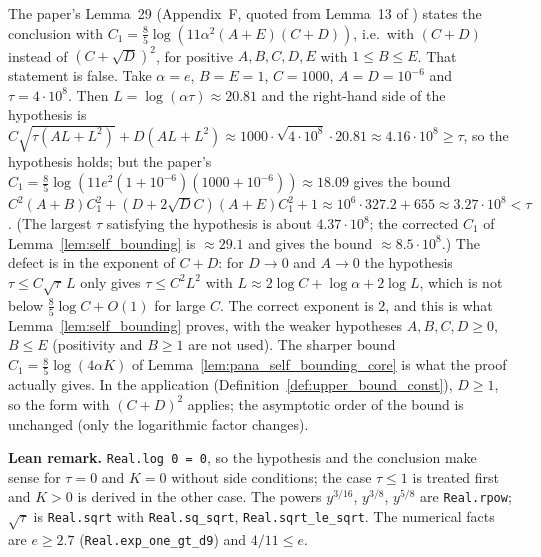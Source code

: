 \begin{remark}\label{rem:pana_self_bounding_paper}
The paper's Lemma~29 (Appendix~F, quoted from Lemma~13 of \cite{menard2021fast}) states the
conclusion with $C_1 = \frac85\log(11\alpha^2(A+E)(C+D))$, i.e.\ with $(C + D)$ instead of
$(C + \sqrt D)^2$, for positive $A, B, C, D, E$ with $1 \le B \le E$. That statement is false.
Take $\alpha = e$, $B = E = 1$, $C = 1000$, $A = D = 10^{-6}$ and $\tau = 4\cdot 10^8$. Then
$L = \log(\alpha\tau) \approx 20.81$ and the right-hand side of the hypothesis is
$C\sqrt{\tau(AL + L^2)} + D(AL + L^2) \approx 1000\cdot\sqrt{4\cdot10^8}\cdot 20.81
\approx 4.16\cdot 10^8 \ge \tau$, so the hypothesis holds; but the paper's
$C_1 = \frac85\log(11e^2(1 + 10^{-6})(1000 + 10^{-6})) \approx 18.09$ gives the bound
$C^2(A+B)C_1^2 + (D + 2\sqrt D C)(A+E)C_1^2 + 1 \approx 10^6\cdot 327.2 + 655 \approx 3.27\cdot 10^8 < \tau$.
(The largest $\tau$ satisfying the hypothesis is about $4.37\cdot 10^8$; the corrected $C_1$
of Lemma~\ref{lem:self_bounding} is $\approx 29.1$ and gives the bound $\approx 8.5\cdot10^8$.)
The defect is in the exponent of $C + D$: for $D \to 0$ and $A \to 0$ the hypothesis
$\tau \le C\sqrt\tau\,L$ only gives $\tau \le C^2L^2$ with $L \approx 2\log C + \log\alpha +
2\log L$, which is not below $\frac85\log C + O(1)$ for large $C$. The correct exponent is
$2$, and this is what Lemma~\ref{lem:self_bounding} proves, with the weaker hypotheses
$A, B, C, D \ge 0$, $B \le E$ (positivity and $B \ge 1$ are not used). The sharper bound
$C_1 = \frac85\log(4\alpha K)$ of Lemma~\ref{lem:pana_self_bounding_core} is what the proof
actually gives. In the application (Definition~\ref{def:upper_bound_const}), $D \ge 1$, so
the form with $(C + D)^2$ applies; the asymptotic order of the bound is unchanged (only the
logarithmic factor changes).

\textbf{Lean remark.} \texttt{Real.log 0 = 0}, so the hypothesis and the conclusion make sense
for $\tau = 0$ and $K = 0$ without side conditions; the case $\tau \le 1$ is treated first and
$K > 0$ is derived in the other case. The powers $y^{3/16}$, $y^{3/8}$, $y^{5/8}$ are
\texttt{Real.rpow}; $\sqrt\tau$ is \texttt{Real.sqrt} with \texttt{Real.sq\_sqrt},
\texttt{Real.sqrt\_le\_sqrt}. The numerical facts are $e \ge 2.7$
(\texttt{Real.exp\_one\_gt\_d9}) and $4/11 \le e$.
\end{remark}
